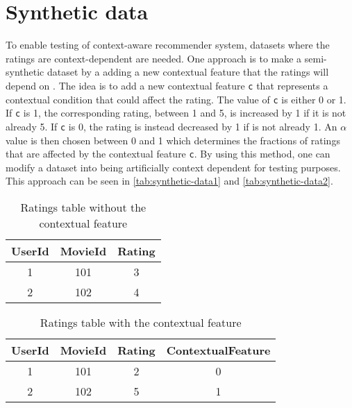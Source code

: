 \section{Synthetic data}
To enable testing of context-aware recommender system, datasets where the ratings are context-dependent are needed.
One approach is to make a semi-synthetic dataset by a adding a new contextual feature that the ratings will depend on \cite{baltrunasContextItemSplit}.
The idea is to add a new contextual feature \texttt{c} that represents a contextual condition that could affect the rating.
The value of \texttt{c} is either 0 or 1. 
If \texttt{c} is 1, the corresponding rating, between 1 and 5, is increased by 1 if it is not already 5.
If \texttt{c} is 0, the rating is instead decreased by 1 if is not already 1.
An $\alpha$ value is then chosen between 0 and 1 which determines the fractions of ratings that are affected by the contextual feature \texttt{c}.
By using this method, one can modify a dataset into being artificially context dependent for testing purposes.
This approach can be seen in \autoref{tab:synthetic-data1} and \autoref{tab:synthetic-data2}.
\begin{table}[hbt!]
    \centering
    \begin{tabular}{|c|c|c|}
    \hline
    UserId & MovieId & Rating \\ [0.5ex] 
    \hline\hline
    1 & 101 & 3 \\
    \hline
    2 & 102 & 4 \\
    \hline
    \end{tabular}
    \caption{Ratings table without the contextual feature}
    \label{tab:synthetic-data1}
\end{table}
\begin{table}[hbt!]
    \centering
    \begin{tabular}{|c|c|c|c|} 
    \hline
    UserId & MovieId & Rating & ContextualFeature \\ [0.5ex] 
    \hline\hline
    1 & 101 & 2 & 0 \\
    \hline
    2 & 102 & 5 & 1 \\
    \hline
    \end{tabular}
    \caption{Ratings table with the contextual feature}
    \label{tab:synthetic-data2}
\end{table}